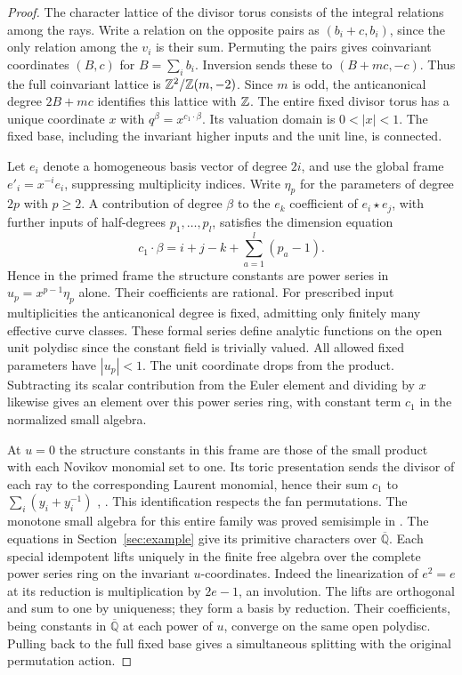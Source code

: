 \begin{proof}
The character lattice of the divisor torus consists of the integral relations among the rays. Write a relation on the opposite pairs as $(b_i+c,b_i)$, since the only relation among the $v_i$ is their sum. Permuting the pairs gives coinvariant coordinates $(B,c)$ for $B=\sum_i b_i$. Inversion sends these to $(B+mc,-c)$. Thus the full coinvariant lattice is $\mathbb Z^2/\mathbb Z(m,-2)$. Since $m$ is odd, the anticanonical degree $2B+mc$ identifies this lattice with $\mathbb Z$. The entire fixed divisor torus has a unique coordinate $x$ with $q^\beta=x^{c_1\cdot\beta}$. Its valuation domain is $0<|x|<1$. The fixed base, including the invariant higher inputs and the unit line, is connected.

Let $e_i$ denote a homogeneous basis vector of degree $2i$, and use the global frame $e'_i=x^{-i}e_i$, suppressing multiplicity indices. Write $\eta_p$ for the parameters of degree $2p$ with $p\ge2$. A contribution of degree $\beta$ to the $e_k$ coefficient of $e_i\star e_j$, with further inputs of half-degrees $p_1,\ldots,p_l$, satisfies the dimension equation
\[
             c_1\cdot\beta=i+j-k+\sum_{a=1}^l(p_a-1).
\]
Hence in the primed frame the structure constants are power series in $u_p=x^{p-1}\eta_p$ alone. Their coefficients are rational. For prescribed input multiplicities the anticanonical degree is fixed, admitting only finitely many effective curve classes. These formal series define analytic functions on the open unit polydisc since the constant field is trivially valued. All allowed fixed parameters have $|u_p|<1$. The unit coordinate drops from the product. Subtracting its scalar contribution from the Euler element and dividing by $x$ likewise gives an element over this power series ring, with constant term $c_1$ in the normalized small algebra.

At $u=0$ the structure constants in this frame are those of the small product with each Novikov monomial set to one. Its toric presentation sends the divisor of each ray to the corresponding Laurent monomial, hence their sum $c_1$ to $\sum_i(y_i+y_i^{-1})$ \cite[Proposition~3.3]{OT}, \cite[\S1.7]{MM}. This identification respects the fan permutations. The monotone small algebra for this entire family was proved semisimple in \cite[Proposition~1.6.1]{MM}. The equations in Section~\ref{sec:example} give its primitive characters over $\overline{\mathbb Q}$. Each special idempotent lifts uniquely in the finite free algebra over the complete power series ring on the invariant $u$-coordinates. Indeed the linearization of $e^2=e$ at its reduction is multiplication by $2e-1$, an involution. The lifts are orthogonal and sum to one by uniqueness; they form a basis by reduction. Their coefficients, being constants in $\overline{\mathbb Q}$ at each power of $u$, converge on the same open polydisc. Pulling back to the full fixed base gives a simultaneous splitting with the original permutation action.


\end{proof}
